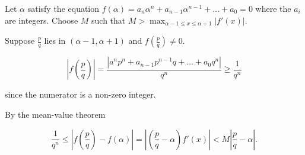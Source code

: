 \documentclass[12pt]{article}
\begin{document}
Let $\alpha$ satisfy the equation $f(\alpha)=a_n\alpha^n+a_{n-1}\alpha^{n-1}+\dots+a_0=0$ where the $a_i$ are integers. Choose $M$ such that $M>\max_{\alpha-1\leq x\leq\alpha+1}|f'(x)|$.

Suppose $\frac{p}{q}$ lies in $(\alpha-1,\alpha+1)$ and $f\left(\frac{p}{q}\right)\neq 0$.

$$\left|f\left(\frac{p}{q}\right)\right|=\frac{\left|a^np^n+a_{n-1}p^{n-1}q+\dots+a_0q^n\right|}{q^n}\geq\frac{1} {q^n}$$

since the numerator is a non-zero integer.

By the mean-value theorem 

$$\frac{1}{q^n}\leq \left|f\left(\frac{p}{q}\right)-f(\alpha)\right|=\left|\left(\frac{p}{q}-\alpha\right)f'(x)\right|<M\left|\frac{p}{q}-\alpha\right|.$$
\end{document}
